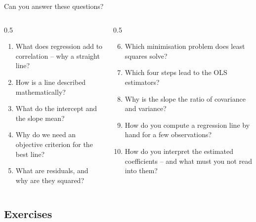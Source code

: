 \documentclass[aspectratio=169,11pt]{beamer}
\begin{document}
\begin{frame}{Can you answer these questions?}
  \small
  \begin{columns}[T]
    \begin{column}{0.5\textwidth}
      \begin{enumerate}
        \setlength{\itemsep}{2pt}
        \item What does regression add to correlation -- why a straight
              line?
        \item How is a line described mathematically?
        \item What do the intercept and the slope mean?
        \item Why do we need an objective criterion for the best line?
        \item What are residuals, and why are they squared?
      \end{enumerate}
    \end{column}
    \begin{column}{0.5\textwidth}
      \begin{enumerate}
        \setcounter{enumi}{5}
        \setlength{\itemsep}{2pt}
        \item Which minimisation problem does least squares solve?
        \item Which four steps lead to the OLS estimators?
        \item Why is the slope the ratio of covariance and variance?
        \item How do you compute a regression line by hand for a few
              observations?
        \item How do you interpret the estimated coefficients -- and what
              must you not read into them?
      \end{enumerate}
    \end{column}
  \end{columns}

  \medskip

\end{frame}

\subsection{Exercises}
\end{document}
